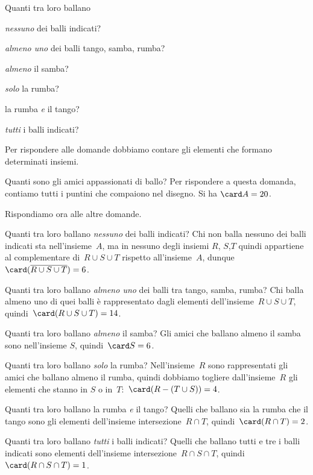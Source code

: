 {\begin{exrig}
\begin{esempio}
\begin{multicols}{2}
Quanti tra loro ballano
\begin{enumeratea}
\item \emph{nessuno} dei balli indicati?
\item \emph{almeno uno} dei balli tango, samba, rumba?
\item \emph{almeno} il samba?
\item \emph{solo} la rumba?
\item la rumba \emph{e} il tango?
\item \emph{tutti} i balli indicati?
\end{enumeratea}
\begin{center}
 
\end{center}
\end{multicols}

Per rispondere alle domande dobbiamo contare gli elementi che formano 
determinati insiemi.

Quanti sono gli amici appassionati di ballo? Per rispondere a questa
domanda, contiamo tutti i puntini che compaiono nel disegno. Si ha 
$\card A=20$.

Rispondiamo ora alle altre domande.
\begin{enumeratea}
 \item Quanti tra loro ballano \emph{nessuno} dei balli indicati?
Chi non balla nessuno dei balli indicati sta nell'insieme~$A$, ma in nessuno 
degli insiemi $R$, $S$,$T$ quindi appartiene al complementare
di~$R\cup S\cup T$ rispetto all'insieme~$A$,
dunque~$\card (\overline{{R\cup S\cup T}})=6$.
 \item Quanti tra loro ballano \emph{almeno uno} dei balli tra tango, 
samba, rumba? Chi balla almeno uno di quei balli è rappresentato dagli elementi
dell'insieme~$R\cup S\cup T$, quindi~$\card(R\cup S\cup T)=14$.
 \item Quanti tra loro ballano \emph{almeno} il samba?
Gli amici che ballano almeno il samba sono nell'insieme
$S$, quindi~$\card S=6$.
 \item Quanti tra loro ballano \emph{solo} la rumba? Nell'insieme~$R$ 
sono rappresentati gli amici che ballano almeno il rumba, quindi dobbiamo 
togliere dall'insieme~$R$ gli elementi che stanno 
in $S$ o in~$T$:~$\card(R-(T\cup S))=4$.
 \item Quanti tra loro ballano la rumba \emph{e} il tango? 
Quelli che ballano sia la rumba che il tango sono gli elementi
dell'insieme intersezione~$R\cap T$, quindi~$\card(R\cap T)=2$.
 \item Quanti tra loro ballano \emph{tutti} i balli indicati? 
Quelli che ballano tutti e tre i balli indicati sono elementi
dell'insieme intersezione~$R\cap S\cap T$, quindi~$\card(R\cap S\cap T)=1$.
\end{enumeratea}


\end{esempio}
\end{exrig}}
